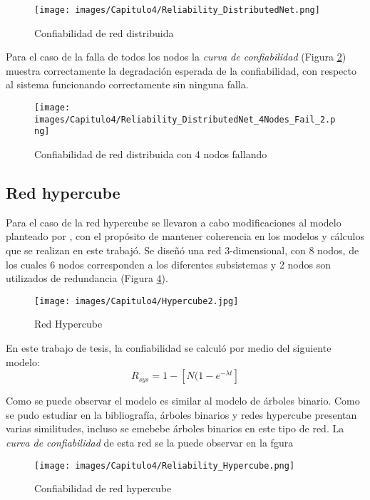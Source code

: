 \begin{figure}[H]
 \centering
 \texttt{[image: images/Capitulo4/Reliability\_DistributedNet.png]}
  \caption{Confiabilidad de red distribuida}
\label{fig:reliability_distributedNet}
\end{figure}


Para el caso de la falla de todos los nodos la \textit{curva de confiabilidad} (Figura \ref{fig:reliability_distributedNet_4Nodes_Fail}) muestra correctamente la degradación esperada de la confiabilidad, con respecto al sistema funcionando correctamente sin ninguna falla.

\begin{figure}[H]
 \centering
 \texttt{[image: images/Capitulo4/Reliability\_DistributedNet\_4Nodes\_Fail\_2.png]}
  \caption{Confiabilidad de red distribuida con 4 nodos fallando}
\label{fig:reliability_distributedNet_4Nodes_Fail}
\end{figure}

\subsection{Red hypercube}
Para el caso de la red hypercube se llevaron a cabo modificaciones al modelo planteado por \cite{Mostafa14}, con el propósito de mantener coherencia en los modelos y cálculos que se realizan en este trabajó. Se diseñó una red 3-dimensional, con 8 nodos,  de los cuales 6 nodos corresponden a los diferentes subsistemas y 2 nodos son utilizados de redundancia (Figura \ref{fig:Reliability_Hypercube}).

\begin{figure}[H]
 \centering
 \texttt{[image: images/Capitulo4/Hypercube2.jpg]}
  \caption{Red Hypercube}
\label{fig:Hypercube}
\end{figure}

En este trabajo de tesis, la confiabilidad se calculó por medio del siguiente modelo: $$R_{sys} = 1- [N (1 - e^{- \lambda t}]$$

Como se puede observar el modelo es similar al modelo de árboles binario. Como se pudo estudiar en la bibliografía, árboles binarios y redes hypercube presentan varias similitudes, incluso se emebebe árboles binarios en este tipo de red. La \textit{curva de confiabilidad} de esta red se la puede observar en la fgura

\begin{figure}[H]
 \centering
 \texttt{[image: images/Capitulo4/Reliability\_Hypercube.png]}
  \caption{Confiabilidad de red hypercube}
\label{fig:Reliability_Hypercube}
\end{figure}

